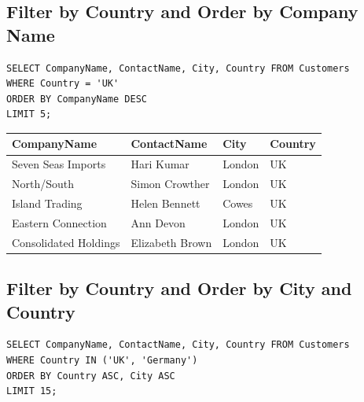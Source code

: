 \documentclass[10pt]{article}
\begin{document}
\subsection{Filter by Country and Order by Company Name}
\begin{verbatim}
SELECT CompanyName, ContactName, City, Country FROM Customers 
WHERE Country = 'UK'
ORDER BY CompanyName DESC
LIMIT 5;
\end{verbatim}


\begin{table}[H]
\begin{tabular}{|l|l|l|l|}
\hline
CompanyName	& ContactName	& City	& Country \\
\hline
Seven Seas Imports	& Hari Kumar	& London	& UK \\
North/South	& Simon Crowther	& London	& UK \\
Island Trading	& Helen Bennett	& Cowes	& UK \\
Eastern Connection	& Ann Devon	& London	& UK \\
Consolidated Holdings	& Elizabeth Brown	& London	& UK \\
\hline
\end{tabular}
\end{table}


\subsection{Filter by Country and Order by City and Country}
\begin{verbatim}
SELECT CompanyName, ContactName, City, Country FROM Customers 
WHERE Country IN ('UK', 'Germany')
ORDER BY Country ASC, City ASC
LIMIT 15;
\end{verbatim}
\end{document}
